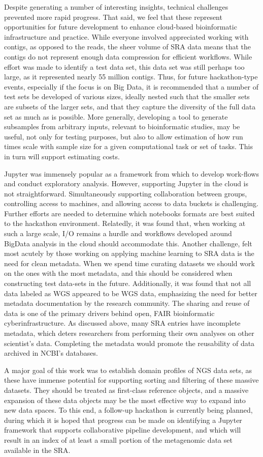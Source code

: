 Despite generating a number of interesting insights, technical challenges
prevented more rapid progress. That said, we feel that these represent
opportunities for future development to enhance cloud-based bioinformatic
infrastructure and practice. While everyone involved appreciated working with
contigs, as opposed to the reads, the sheer volume of SRA data means that the
contigs do not represent enough data compression for efficient workflows. While
effort was made to identify a test data set, this data set was still perhaps
too large, as it represented nearly 55 million contigs. Thus, for future
hackathon-type events, especially if the focus is on Big Data, it is
recommended that a number of test sets be developed of various sizes, ideally
nested such that the smaller sets are subsets of the larger sets, and that they
capture the diversity of the full data set as much as is possible. More
generally, developing a tool to generate subsamples from arbitrary inputs,
relevant to bioinformatic studies, may be useful, not only for testing
purposes, but also to allow estimation of how run times scale with sample size
for a given computational task or set of tasks. This in turn will support
estimating costs.

Jupyter was immensely popular as a framework from which to develop work-flows
and conduct exploratory analysis. However, supporting Jupyter in the cloud is
not straightforward. Simultaneously supporting collaboration between groups,
controlling access to machines, and allowing access to data buckets is
challenging. Further efforts are needed to determine which notebooks formats
are best suited to the hackathon environment. Relatedly, it was found that,
when working at such a large scale, I/O remains a hurdle and workflows
developed around BigData analysis in the cloud should accommodate this. Another
challenge, felt most acutely by those working on applying machine learning to
SRA data is the need for clean metadata. When we spend time curating datasets
we should work on the ones with the most metadata, and this should be
considered when constructing test data-sets in the future. Additionally, it was
found that not all data labeled as WGS appeared to be WGS data, emphasizing the
need for better metadata documentation by the research community. The sharing
and reuse of data is one of the primary drivers behind open, FAIR bioinformatic
cyberinfrastructure. As discussed above, many SRA entries have incomplete
metadata, which deters researchers from performing their own analyses on other
scientist’s data. Completing the metadata would promote the reusability of data
archived in NCBI’s databases.

A major goal of this work was to establish domain profiles of NGS data sets, as
these have immense potential for supporting sorting and filtering of these
massive datasets. They should be treated as first-class reference objects, and
a massive expansion of these data objects may be the most effective way to
expand into new data spaces. To this end, a follow-up hackathon is currently
being planned, during which it is hoped that progress can be made on
identifying a Jupyter framework that supports collaborative pipeline
development, and which will result in an index of at least a small portion of
the metagenomic data set available in the SRA.

